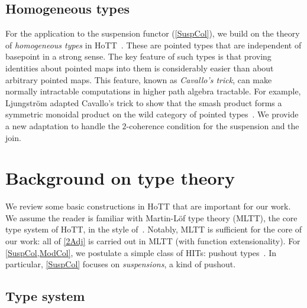 \documentclass{lmcs}
\theoremstyle{definition}\newtheorem{note}[thm]{Note}
\begin{document}
\subsection{Homogeneous types}

For the application to the suspension functor (\autoref{SuspCol}), we build on the theory of \emph{homogeneous types} in HoTT~\cite[Section 2]{banded}. These are pointed types that are independent of basepoint in a strong sense. The key feature of such types is that proving identities about pointed maps into them is considerably easier than about arbitrary pointed maps. This feature, known as \emph{Cavallo's trick}, can make normally intractable computations in higher path algebra tractable. For example, Ljungstr\"om adapted Cavallo's trick to show that the smash product forms a symmetric monoidal product on the wild category of pointed types~\cite{smashmon}. We provide a new adaptation to handle the $2$-coherence condition for the suspension and the join.

\section{Background on type theory}\label{Backg}

We review some basic constructions in HoTT that are important for our work. We assume the reader is familiar with Martin-L\"of type theory (MLTT), the core type system of HoTT, in the style of~\cite{Uni13}. Notably, MLTT is sufficient for the core of our work: all of \autoref{2Adj} is carried out in MLTT (with function extensionality). For \cref{SuspCol,ModCol}, we postulate a simple class of HITs: pushout types~\cite[Section 6.8]{Uni13}. In particular, \autoref{SuspCol} focuses on \emph{suspensions}, a kind of pushout.

\subsection{Type system}
\end{document}
